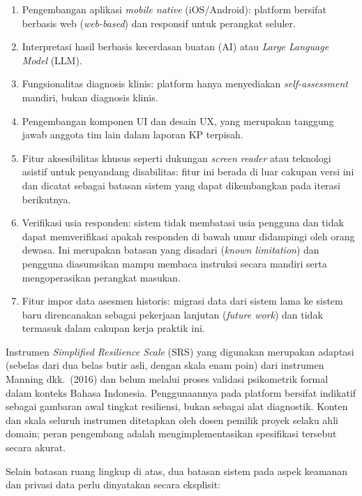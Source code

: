 \begin{enumerate}[leftmargin=2cm]
  \item Pengembangan aplikasi \textit{mobile native} (iOS/Android): platform bersifat berbasis web (\textit{web-based}) dan responsif untuk perangkat seluler.
  \item Interpretasi hasil berbasis kecerdasan buatan (AI) atau \textit{Large Language Model} (LLM).
  \item Fungsionalitas diagnosis klinis: platform hanya menyediakan \textit{self-assessment} mandiri, bukan diagnosis klinis.
  \item Pengembangan komponen UI dan desain UX, yang merupakan tanggung jawab anggota tim lain dalam laporan KP terpisah.
  \item Fitur aksesibilitas khusus seperti dukungan \textit{screen reader} atau teknologi asistif untuk penyandang disabilitas: fitur ini berada di luar cakupan versi ini dan dicatat sebagai batasan sistem yang dapat dikembangkan pada iterasi berikutnya.
  \item Verifikasi usia responden: sistem tidak membatasi usia pengguna dan tidak dapat memverifikasi apakah responden di bawah umur didampingi oleh orang dewasa. Ini merupakan batasan yang disadari (\textit{known limitation}) dan pengguna diasumsikan mampu membaca instruksi secara mandiri serta mengoperasikan perangkat masukan.
  \item Fitur impor data asesmen historis: migrasi data dari sistem lama ke sistem baru direncanakan sebagai pekerjaan lanjutan (\textit{future work}) dan tidak termasuk dalam cakupan kerja praktik ini.
\end{enumerate}

Instrumen \textit{Simplified Resilience Scale} (SRS) yang digunakan merupakan adaptasi (sebelas dari dua belas butir asli, dengan skala enam poin) dari instrumen Manning dkk.\ (2016) dan belum melalui proses validasi psikometrik formal dalam konteks Bahasa Indonesia. Penggunaannya pada platform bersifat indikatif sebagai gambaran awal tingkat resiliensi, bukan sebagai alat diagnostik. Konten dan skala seluruh instrumen ditetapkan oleh dosen pemilik proyek selaku ahli domain; peran pengembang adalah mengimplementasikan spesifikasi tersebut secara akurat.

Selain batasan ruang lingkup di atas, dua batasan sistem pada aspek keamanan dan privasi data perlu dinyatakan secara eksplisit:


